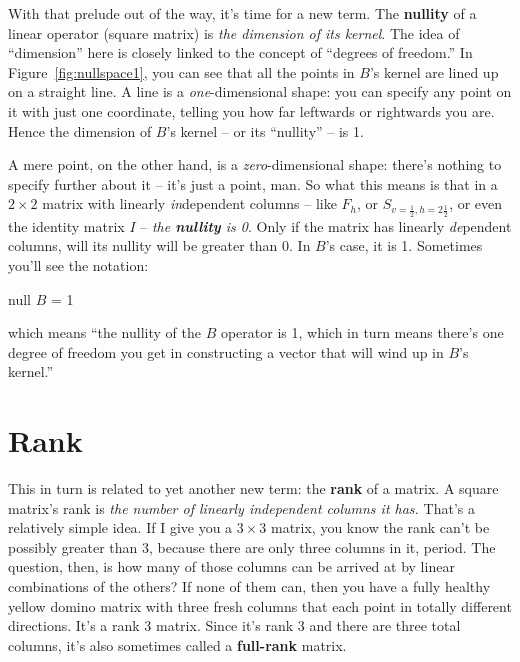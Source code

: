 
With that prelude out of the way, it's time for a new term. The
\textbf{nullity} of a linear operator (square matrix) is \textit{the dimension
of its kernel}. The idea of ``dimension'' here is closely linked to the concept
of ``degrees of freedom.'' In Figure~\ref{fig:nullspace1}, you can see that all
the points in $B$'s kernel are lined up on a straight line. A line is a
\textit{one}-dimensional shape: you can specify any point on it with just one
coordinate, telling you how far leftwards or rightwards you are. Hence the
dimension of $B$'s kernel -- or its ``nullity'' -- is 1.

A mere point, on the other hand, is a \textit{zero}-dimensional shape: there's
nothing to specify further about it -- it's just a point, man. So what this
means is that in a $2\times 2$ matrix with linearly \textit{in}dependent
columns -- like $F_{h}$, or $S_{v=\frac{1}{2},h=2\frac{1}{2}}$, or even the
identity matrix $I$ -- \textit{the \textbf{nullity} is 0}. Only if the matrix
has linearly \textit{de}pendent columns, will its nullity will be greater than
0. In $B$'s case, it is 1. Sometimes you'll see the notation:

\vspace{-.15in}
\begin{center}
null $B$ = 1
\end{center}
\vspace{-.15in}

which means ``the nullity of the $B$ operator is 1, which in turn means there's
one degree of freedom you get in constructing a vector that will wind up in
$B$'s kernel.''

\section{Rank}

This in turn is related to yet another new term: the \textbf{rank} of a matrix.
A square matrix's rank is \textit{the number of linearly independent columns it
has.} That's a relatively simple idea. If I give you a $3\times 3$ matrix, you
know the rank can't be possibly greater than 3, because there are only three
columns in it, period. The question, then, is how many of those columns can be
arrived at by linear combinations of the others? If none of them can, then you
have a fully healthy yellow domino matrix with three fresh columns that each
point in totally different directions. It's a rank 3 matrix. Since it's rank 3
and there are three total columns, it's also sometimes called a
\textbf{full-rank} matrix.

